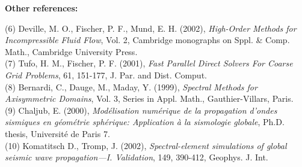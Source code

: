 \documentclass{article}
\begin{document}
\noindent \textbf{Other references:}\vspace*{0.2cm}

(6) Deville, M. O., Fischer, P. F., Mund, E. H. (2002), 
\textit{High-Order Methods for Incompressible Fluid Flow}, 
Vol. 2, Cambridge monographs on Sppl. \& Comp. Math., Cambridge University Press.\\

(7) Tufo, H. M., Fischer, P. F. (2001), \textit{Fast Parallel Direct Solvers For Coarse Grid Problems}, 
61, 151-177, J. Par. and Dist. Comput.\\

(8) Bernardi, C., Dauge, M., Maday, Y. (1999), \textit{Spectral Methods for Axisymmetric Domains}, 
Vol. 3, Series in Appl. Math., Gauthier-Villars, Paris.\\

(9) Chaljub, E. (2000), \textit{Mod{\'{e}}lisation num{\'{e}}rique de la 
propagation d'ondes sismiques en g{\'{e}}om{\'{e}}trie sph{\'{e}}rique:
Application {\`{a}} la sismologie globale}, 
Ph.D. thesis, Universit{\'{e}} de Paris 7.\\

(10) Komatitsch D., Tromp, J. (2002), \textit{Spectral-element simulations of
global seismic wave propagation---I. Validation},
149, 390-412, Geophys. J. Int.
\end{document}
